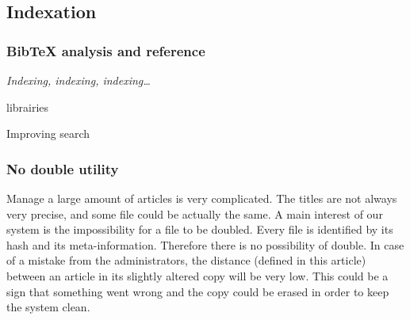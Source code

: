 \subsection{Indexation}

\subsubsection{Bib\TeX{} analysis and reference}

\textit{Indexing, indexing, indexing\ldots}

librairies
\cite{Lawrence99digitallibraries}

Improving search
\cite{Reynolds_efficientpeer-to-peer}

\cite{Yang02improvingsearch}


\subsubsection{No double utility}

Manage a large amount of articles is very complicated. The titles
are not always very precise, and some file could be actually the same.
A main interest of our system is the impossibility for a 
file to be doubled. Every file is identified by its hash and its
meta-information. Therefore there is no possibility of double. In
case of a mistake from the administrators, the distance (defined in
this article) between
an article in its slightly altered copy will be very low. This could
be a sign that something went wrong and the copy could be erased in
order to keep the system clean.
